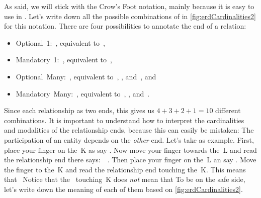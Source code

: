 As said, we will stick with the Crow's Foot notation, mainly because it is easy to use in \yEd.
Let's write down all the possible combinations of  in \cref{fig:erdCardinalities2} for this notation.
There are four possibilities to annotate the end of a relation:%
\begin{itemize}%
\item Optional~1:~\crowsFootOptionalOne, equivalent to~,%
\item Mandatory~1:~\crowsFootMandatoryOne, equivalent to~,%
\item Optional~Many:~\crowsFootOptionalMany, equivalent to~, , and~, and%
\item Mandatory~Many:~\crowsFootMandatoryMany, equivalent to~, , and~.%
\end{itemize}%
%
Since each relationship as two ends, this gives us $4+3+2+1=10$ different combinations.
It is important to understand how to interpret the cardinalities and modalities of the relationship ends, because this can easily be mistaken:
The participation of an entity depends on the \emph{other} end.
Let's take  as example.
First, place your finger on the~K as say .
Now move your finger towards the~L and read the relationship end there says:~~\cite{R2016HDIRENCFTCTNL}.
Then place your finger on the~L an say .
Move the finger to the~K and read the relationship end touching the~K.
This means that~
Notice that the \crowsFootMandatoryOne\ touching~K does \emph{not} mean that 
To be on the safe side, let's write down the meaning of each of them based on \cref{fig:erdCardinalities2}.%
%
